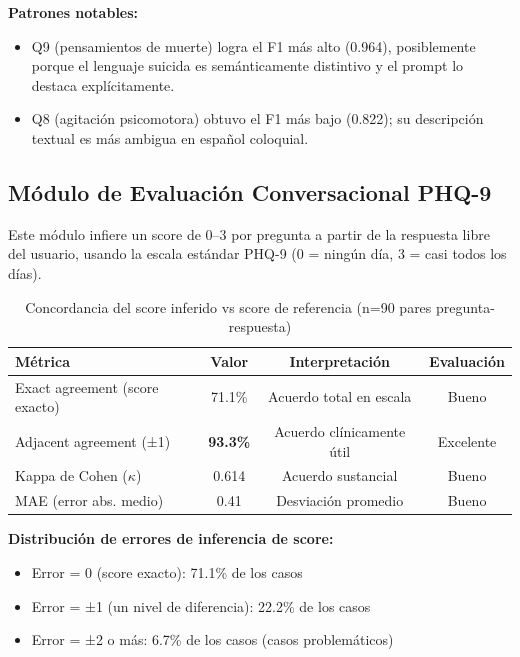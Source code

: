 \textbf{Patrones notables:}
\begin{itemize}
    \item Q9 (pensamientos de muerte) logra el F1 más alto (0.964), posiblemente porque el
          lenguaje suicida es semánticamente distintivo y el prompt lo destaca
          explícitamente.
    \item Q8 (agitación psicomotora) obtuvo el F1 más bajo (0.822); su descripción textual
          es más ambigua en español coloquial.
\end{itemize}

\subsection{Módulo de Evaluación Conversacional PHQ-9}

Este módulo infiere un score de 0–3 por pregunta a partir de la respuesta libre del
usuario, usando la escala estándar PHQ-9 (0 = ningún día, 3 = casi todos los días).

\begin{table}[H]
\centering
\caption{Concordancia del score inferido vs score de referencia (n=90 pares pregunta-respuesta)}
\label{tab:phq9_conv_agreement}
\begin{tabular}{lccc}
\toprule
\textbf{Métrica}              & \textbf{Valor} & \textbf{Interpretación}   & \textbf{Evaluación} \\
\midrule
Exact agreement (score exacto)& 71.1\%         & Acuerdo total en escala   & Bueno     \\
Adjacent agreement (±1)       & \textbf{93.3\%}& Acuerdo clínicamente útil & Excelente \\
Kappa de Cohen ($\kappa$)     & 0.614          & Acuerdo sustancial        & Bueno     \\
MAE (error abs. medio)        & 0.41           & Desviación promedio       & Bueno     \\
\bottomrule
\end{tabular}
\end{table}

\textbf{Distribución de errores de inferencia de score:}
\begin{itemize}
    \item Error = 0 (score exacto): 71.1\% de los casos
    \item Error = ±1 (un nivel de diferencia): 22.2\% de los casos
    \item Error = ±2 o más: 6.7\% de los casos (casos problemáticos)
\end{itemize}

